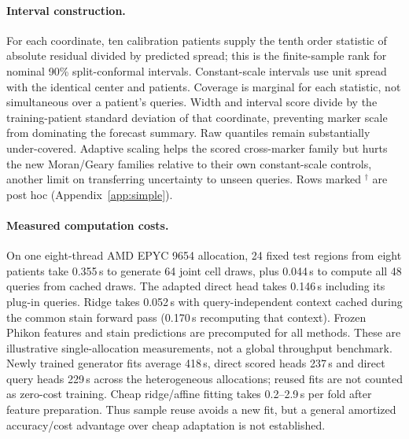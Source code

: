 \documentclass[10pt,letterpaper]{article}
\theoremstyle{definition}
\theoremstyle{remark}
\begin{document}
\paragraph{Interval construction.} For each coordinate, ten calibration patients supply the tenth order statistic of absolute residual divided by predicted spread; this is the finite-sample rank for nominal 90\% split-conformal intervals. Constant-scale intervals use unit spread with the identical center and patients. Coverage is marginal for each statistic, not simultaneous over a patient's queries. Width and interval score divide by the training-patient standard deviation of that coordinate, preventing marker scale from dominating the forecast summary. Raw quantiles remain substantially under-covered. Adaptive scaling helps the scored cross-marker family but hurts the new Moran/Geary families relative to their own constant-scale controls, another limit on transferring uncertainty to unseen queries. Rows marked $^\dagger$ are post hoc (Appendix~\ref{app:simple}).



\paragraph{Measured computation costs.} On one eight-thread AMD EPYC 9654 allocation, 24 fixed test regions from eight patients take 0.355\,s to generate 64 joint cell draws, plus 0.044\,s to compute all 48 queries from cached draws. The adapted direct head takes 0.146\,s including its plug-in queries. Ridge takes 0.052\,s with query-independent context cached during the common stain forward pass (0.170\,s recomputing that context). Frozen Phikon features and stain predictions are precomputed for all methods. These are illustrative single-allocation measurements, not a global throughput benchmark. Newly trained generator fits average 418\,s, direct scored heads 237\,s and direct query heads 229\,s across the heterogeneous allocations; reused fits are not counted as zero-cost training. Cheap ridge/affine fitting takes 0.2--2.9\,s per fold after feature preparation. Thus sample reuse avoids a new fit, but a general amortized accuracy/cost advantage over cheap adaptation is not established.
\end{document}
